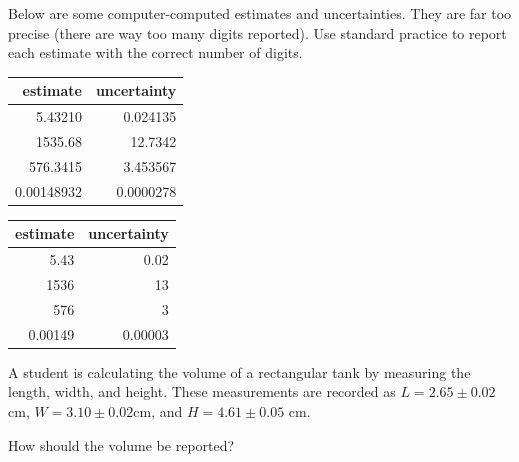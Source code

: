 \documentclass[twoside]{book}\usepackage[]{graphicx}\usepackage[]{xcolor}
\begin{document}
\begin{problem}
	Below are some computer-computed estimates and uncertainties.  They are far too precise (there are way too
	many digits reported).  Use standard practice to report each estimate with the correct number of digits.

	\begin{center}
	\begin{tabular}{rr}
		\hline
		estimate & uncertainty
		\\
		\hline
		5.43210 & 0.024135
		\\
		1535.68 & 12.7342 
		\\
		576.3415 & 3.453567
		\\
		0.00148932 & 0.0000278
		\\
		\hline
	\end{tabular}
	\end{center}
\end{problem}

\begin{solution}
	\begin{center}
	\begin{tabular}{rr}
		\hline
		estimate & uncertainty
		\\
		\hline
		5.43 & 0.02
		\\
		1536 & 13
		\\
		576 & 3
		\\
		0.00149 & 0.00003
		\\
		\hline
	\end{tabular}
	\end{center}
\end{solution}

\begin{problem}
	A student is calculating the volume of a rectangular tank by measuring 
	the length, width, and height.  These measurements are recorded as 
	 $L = 2.65 \pm 0.02$cm, $W = 3.10 \pm 0.02$cm, and $H = 4.61\pm 0.05$ cm.

	 How should the volume be reported?
\end{problem}
\end{document}
